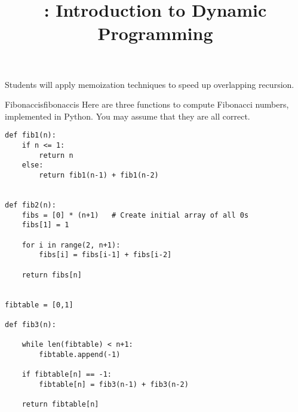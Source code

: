 \documentclass{tufte-handout}
\title{\thecourse: Introduction to Dynamic Programming}
\date{}
\begin{document}
\maketitle

\begin{objective}
  Students will apply memoization techniques to speed up overlapping
  recursion.
\end{objective}

\begin{model}{Fibonaccis}{fibonaccis}
Here are three functions to compute Fibonacci numbers, implemented in
Python.  You may assume that they are all correct.

\begin{verbatim}
def fib1(n):
    if n <= 1:
        return n
    else:
        return fib1(n-1) + fib1(n-2)


def fib2(n):
    fibs = [0] * (n+1)   # Create initial array of all 0s
    fibs[1] = 1

    for i in range(2, n+1):
        fibs[i] = fibs[i-1] + fibs[i-2]

    return fibs[n]


fibtable = [0,1]

def fib3(n):

    while len(fibtable) < n+1:
        fibtable.append(-1)

    if fibtable[n] == -1:
        fibtable[n] = fib3(n-1) + fib3(n-2)

    return fibtable[n]
\end{verbatim}
\end{model}
\end{document}
